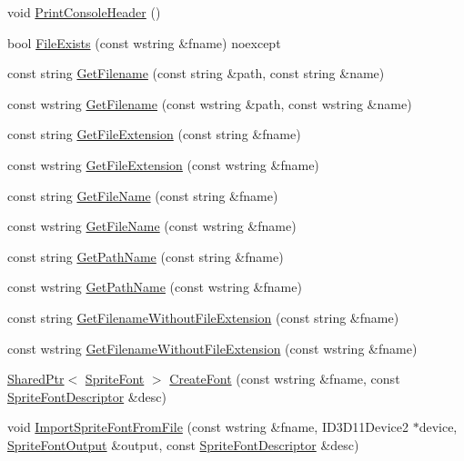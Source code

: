\begin{DoxyCompactItemize}
void \hyperlink{namespacemage_a064756443bd8a1af6974f22c81d29ed0}{Print\+Console\+Header} ()
\item 
bool \hyperlink{namespacemage_a3e9bead16bf9814e6ecd6aca57ccc3e3}{File\+Exists} (const wstring \&fname) noexcept
\item 
const string \hyperlink{namespacemage_aa85467b1af6c9f14e93178cbfd6ca022}{Get\+Filename} (const string \&path, const string \&name)
\item 
const wstring \hyperlink{namespacemage_a42580a2b02794193143aea32e3c815b5}{Get\+Filename} (const wstring \&path, const wstring \&name)
\item 
const string \hyperlink{namespacemage_a4da638506a9dda4f16c41a1a00c0d0e1}{Get\+File\+Extension} (const string \&fname)
\item 
const wstring \hyperlink{namespacemage_a2818c96634f4c8d49dcc4144395b24ef}{Get\+File\+Extension} (const wstring \&fname)
\item 
const string \hyperlink{namespacemage_a167010e334287f9369b15564802a770b}{Get\+File\+Name} (const string \&fname)
\item 
const wstring \hyperlink{namespacemage_ac643523ad89ca58419a2cac93912693b}{Get\+File\+Name} (const wstring \&fname)
\item 
const string \hyperlink{namespacemage_ab3642c6ef6cf94a62fb37b40c3c2f57e}{Get\+Path\+Name} (const string \&fname)
\item 
const wstring \hyperlink{namespacemage_ad23faa6d1854d389eb37fbdeefe97361}{Get\+Path\+Name} (const wstring \&fname)
\item 
const string \hyperlink{namespacemage_ab8841cbab507ef81edb00278110553ad}{Get\+Filename\+Without\+File\+Extension} (const string \&fname)
\item 
const wstring \hyperlink{namespacemage_aac01c0fba57d6737fcf32155748e95b0}{Get\+Filename\+Without\+File\+Extension} (const wstring \&fname)
\item 
\hyperlink{namespacemage_a1e01ae66713838a7a67d30e44c67703e}{Shared\+Ptr}$<$ \hyperlink{classmage_1_1_sprite_font}{Sprite\+Font} $>$ \hyperlink{namespacemage_ac93dae3a8755fa1e1c9be6c8aa0e07d2}{Create\+Font} (const wstring \&fname, const \hyperlink{structmage_1_1_sprite_font_descriptor}{Sprite\+Font\+Descriptor} \&desc)
\item 
void \hyperlink{namespacemage_aac88563417bcd178423aec61ca687a74}{Import\+Sprite\+Font\+From\+File} (const wstring \&fname, I\+D3\+D11\+Device2 $\ast$device, \hyperlink{structmage_1_1_sprite_font_output}{Sprite\+Font\+Output} \&output, const \hyperlink{structmage_1_1_sprite_font_descriptor}{Sprite\+Font\+Descriptor} \&desc)

\end{DoxyCompactItemize}
